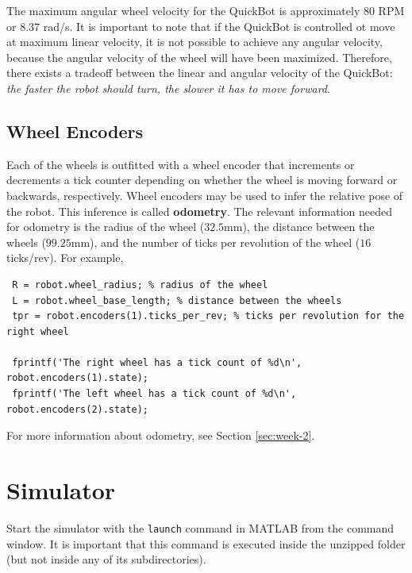 \documentclass[10pt]{article}
\begin{document}
The maximum angular wheel velocity for the QuickBot is approximately 80 RPM or 8.37 rad/s. It is important to note that if the QuickBot is controlled ot move at maximum linear velocity, it is not possible to achieve any angular velocity, because the angular velocity of the wheel will have been maximized. Therefore, there exists a tradeoff between the linear and angular velocity of the QuickBot: \textit{the faster the robot should turn, the slower it has to move forward}.

\subsection{Wheel Encoders}

Each of the wheels is outfitted with a wheel encoder that increments or decrements a tick counter depending on whether the wheel is moving forward or backwards, respectively. Wheel encoders may be used to infer the relative pose of the robot. This inference is called \textbf{odometry}. The relevant information needed for odometry is the radius of the wheel ($32.5$mm), the distance between the wheels ($99.25$mm), and the number of ticks per revolution of the wheel ($16$ ticks/rev). For example,

\begin{verbatim}
 R = robot.wheel_radius; % radius of the wheel
 L = robot.wheel_base_length; % distance between the wheels
 tpr = robot.encoders(1).ticks_per_rev; % ticks per revolution for the right wheel

 fprintf('The right wheel has a tick count of %d\n', robot.encoders(1).state);
 fprintf('The left wheel has a tick count of %d\n', robot.encoders(2).state);
\end{verbatim}

For more information about odometry, see Section \ref{sec:week-2}.

\newpage
\section{Simulator}

Start the simulator with the \texttt{launch} command in MATLAB from the command window. It is important that this command is executed inside the unzipped folder (but not inside any of its subdirectories).
\end{document}
